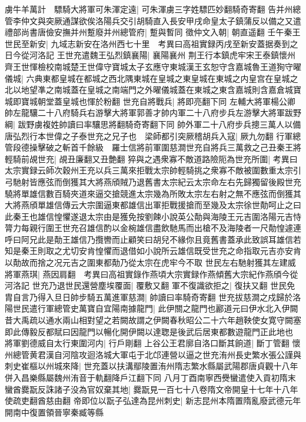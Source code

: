 虜牛羊萬計　驃騎大將軍可朱渾定遠|{
	可朱渾虜三字姓驃匹妙翻騎奇寄翻}
告并州總管李仲文與突厥通謀欲俟洛陽兵交引胡騎直入長安甲戌命皇太子鎮蒲反以備之又遣禮部尚書唐儉安撫并州蹔廢并州總管府|{
	蹔與暫同}
徵仲文入朝|{
	朝直遥翻}
壬午秦王世民至新安|{
	九域志新安在洛州西七十里　考異曰高祖實録丙戌至新安蓋据奏到之日今從河洛記}
王世充遣魏王弘烈鎮襄陽|{
	襄陽襄州}
荆王行本鎮虎牢宋王泰鎮懷州齊王世惲檢校南城楚王世偉守寶城太子玄應守東城漢王玄恕守含嘉城魯王道狥守曜儀城|{
	六典東都皇城在都城之西北隅東城在皇城之東皇城在東城之内皇宫在皇城之北以地望凖之南城蓋在皇城之南端門之外曜儀城蓋在東城之東含嘉城則含嘉倉城寶城即寶城朝堂蓋皇城也惲於粉翻}
世充自將戰兵|{
	將即亮翻下同}
左輔大將軍楊公卿帥左龍驤二十八府騎兵右游擊大將軍郭善才帥内軍二十八府步兵左游擊大將軍跋野綱|{
	跋野虜複姓帥讀曰率驤思將翻騎奇寄翻下同}
帥外軍二十八府步兵摠三萬人以備唐弘烈行本世偉之子泰世充之兄子也　梁師都引突厥稽胡兵入寇|{
	厥九勿翻}
行軍總管段德操擊破之斬首千餘級　羅士信將前軍圍慈澗世充自將兵三萬救之己丑秦王將輕騎前覘世充|{
	覘丑廉翻又丑艶翻}
猝與之遇衆寡不敵道路險阨為世充所圍|{
	考異曰太宗實録云師次穀州王充以兵三萬來拒戰太宗帥輕騎挑之衆寡不敵被圍數重太宗引弓馳射皆應弦而倒獲其大將燕頎賊乃退舊書太宗紀云太宗命左右先歸獨留後殿世充驍將單雄信數百騎夾道來逼交搶競進太宗幾為所敗太宗左右射之無不應弦而倒獲其大將燕頎單雄信傳云大宗圍逼東都雄信出軍拒戰援搶而至幾及太宗徐世勣呵止之曰此秦王也雄信惶懼遂退太宗由是獲免按劉餗小說英公勣與海陵王元吉圍洛陽元吉恃膂力每親行圍王世充召雄信酌以金椀雄信盡飲馳馬而出槍不及海陵者一尺勣惶遽連呼曰阿兄此是勣王雄信乃攬轡而止顧笑曰胡兒不緣你且竟舊書蓋承此致誤耳雄信若知是秦王則取之尤切安肯惶懼而退借如小說所云雄信既受世充之命指取元吉亦安肯以勣故而捨之况元吉之圍東都勣乃從太宗在虎牢今不取}
世民左右馳射獲其左建威將軍燕琪|{
	燕因肩翻　考異曰高祖實錄作燕頃大宗實録作燕傾舊大宗紀作燕頎今從河洛記}
世充乃退世民還營塵埃覆面|{
	覆敷又翻}
軍不復識欲拒之|{
	復扶又翻}
世民免胄自言乃得入旦日帥步騎五萬進軍慈澗|{
	帥讀曰率騎奇寄翻}
世充拔慈澗之戍歸於洛陽世民遣行軍總管史萬寶自宜陽南據龍門|{
	此伊關之龍門也酈道元曰伊水北入伊闕昔大禹疏以通水兩山相對望之若闕故謂之伊闕春秋昭公二十六年趙鞅使女寛守闕塞即此傳毅反都賦曰因龍門以暢化開伊闕以達聦是後武后居東都數遊龍門正此地也}
將軍劉德威自太行東圍河内|{
	行戶剛翻}
上谷公王君廓自洛口斷其餉道|{
	斷丁管翻}
懷州總管黄君漢自河陰攻迴洛城大軍屯于北邙連營以逼之世充洧州長史繁水張公謹與刺史崔樞以州城來降|{
	世充蓋以扶溝鄢陵置洧州隋志繁水縣屬武陽郡唐貞觀十八年併入昌樂縣屬魏州洧音于軌翻降戶江翻下同}
八月丁酉南寧西㸑蠻遣使入貢初隋末蠻酋爨翫反誅諸子没為官奴棄其地|{
	爨翫見一百七十八卷隋文帝開皇十七年十八年使疏吏翻酋慈由翻}
帝即位以翫子弘達為昆州刺史|{
	新志昆州本隋置隋亂廢武德元年開南中復置領晉寧秦臧等縣}
